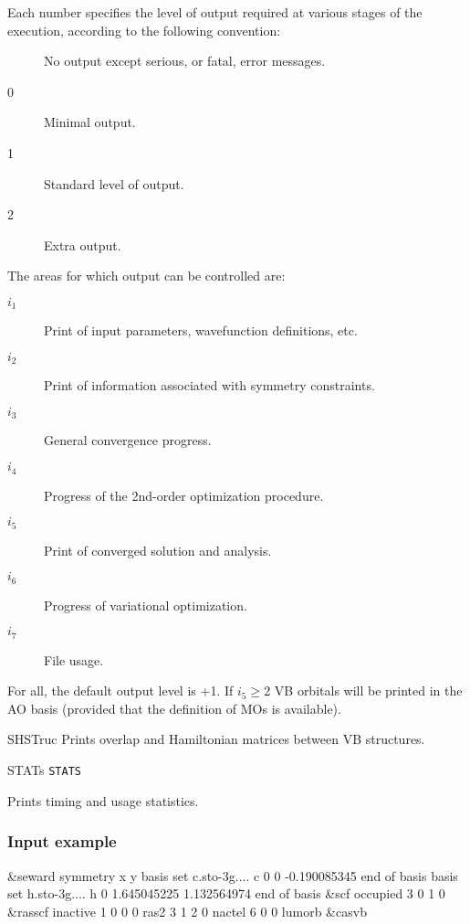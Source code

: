 \begin{keywordlist}
Each number specifies the level of output required at various stages of the execution, according to the
following convention:
\begin{description}
\item[{}]No output except serious, or fatal, error messages.
\item[{\mdseries{ }0}]Minimal output.
\item[{\mdseries{ }1}]Standard level of output.
\item[{\mdseries{ }2}]Extra output.
\end{description}
The areas for which output can be controlled are:
\begin{description}
\item[$i_1$] Print of input parameters, wavefunction definitions, etc.
\item[$i_2$] Print of information associated with symmetry constraints.
\item[$i_3$] General convergence progress.
\item[$i_4$] Progress of the 2nd-order optimization procedure.
\item[$i_5$] Print of converged solution and analysis.
\item[$i_6$] Progress of variational optimization.
\item[$i_7$] File usage.
\end{description}
For all, the default output level is +1. If $i_5$$\geq$2 VB orbitals will
be printed in the AO basis (provided that the definition of MOs is
available).
\item[SHSTruc]
Prints overlap and Hamiltonian matrices between VB structures.
\item[STATs]
{\tt STATS}

Prints timing and usage statistics.
\end{keywordlist}


\subsubsection{Input example}
\begin{inputlisting}
&seward
symmetry
x y
basis set
c.sto-3g....
c 0 0 -0.190085345
end of basis
basis set
h.sto-3g....
h 0 1.645045225 1.132564974
end of basis
&scf
occupied
3 0 1 0
&rasscf
inactive
1 0 0 0
ras2
3 1 2 0
nactel
6 0 0
lumorb
&casvb
\end{inputlisting}

